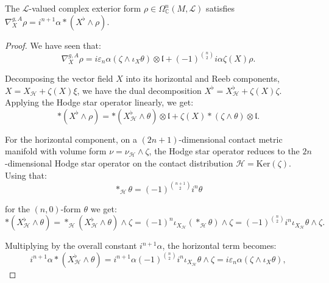 \documentclass[10pt,a4paper]{amsart}
\def\C{\mathbb{C}}
\renewcommand{\ker}{\mathrm{Ker}}
\begin{document}
\begin{lemma}
The $\mathcal{L}$-valued complex exterior form $\rho\in\Omega^n_\C(M,\mathcal{L})$ satisfies $\nabla^{g,A}_X \rho = i^{n+1}\alpha \ast (X^\flat \wedge \rho)$.
\end{lemma}

\begin{proof}
We have seen that:
\begin{equation}
\label{eq:cov_deriv}
\nabla_{X}^{g,A}\rho = i\varepsilon_n\alpha(\zeta \wedge \iota_{X}\theta) \otimes \mathfrak{l} + (-1)^{\binom{n}{2}}i\alpha\zeta(X)\rho.
\end{equation}

\noindent
Decomposing the vector field $X$ into its horizontal and Reeb components, $X = X_{\mathcal{H}} + \zeta(X)\xi$, we have the dual decomposition $X^{\flat} = X_{\mathcal{H}}^{\flat} + \zeta(X)\zeta$. Applying the Hodge star operator linearly, we get:
\begin{equation*}
*(X^{\flat} \wedge \rho) = *(X_{\mathcal{H}}^{\flat} \wedge \theta)\otimes \mathfrak{l} + \zeta(X)*(\zeta \wedge \theta)\otimes \mathfrak{l}.
\end{equation*}

\noindent
For the horizontal component, on a $(2n+1)$-dimensional contact metric manifold with volume form $\nu=\nu_{\mathcal{H}}\wedge\zeta$, the Hodge star operator reduces to the $2n$-dimensional Hodge star operator on the contact distribution $\mathcal{H}=\ker(\zeta)$. Using that:
\begin{equation*}
*_{\mathcal{H}}\theta=(-1)^{\binom{n+1}{2}}i^n\theta
\end{equation*}

\noindent
for the $(n,0)$-form $\theta$ we get:
\begin{equation*}
*(X_{\mathcal{H}}^{\flat} \wedge \theta) = *_{\mathcal{H}}(X_{\mathcal{H}}^{\flat} \wedge \theta) \wedge \zeta = (-1)^n\iota_{X_{\mathcal{H}}}(*_{\mathcal{H}}\theta)\wedge\zeta = (-1)^{\binom{n}{2}}i^n \iota_{X_{\mathcal{H}}} \theta \wedge \zeta.
\end{equation*}

\noindent
Multiplying by the overall constant $i^{n+1}\alpha$, the horizontal term becomes:
\begin{equation*}
i^{n+1}\alpha *(X_{\mathcal{H}}^{\flat} \wedge \theta) = i^{n+1}\alpha (-1)^{\binom{n}{2}}i^n \iota_{X_{\mathcal{H}}} \theta \wedge \zeta = i\varepsilon_n\alpha(\zeta\wedge\iota_X\theta),
\end{equation*}


\end{proof}
\end{document}
